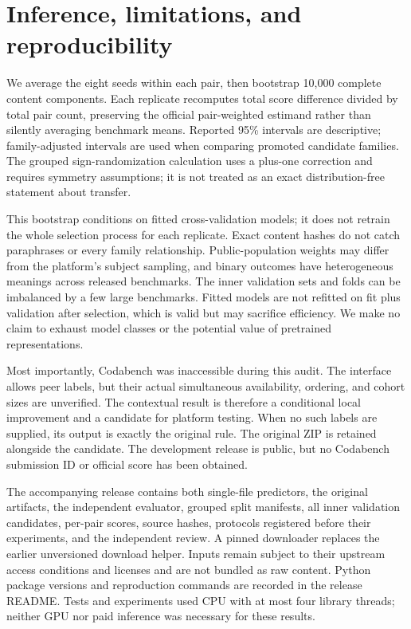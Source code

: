 \documentclass{article}
\begin{document}
\section{Inference, limitations, and reproducibility}
We average the eight seeds within each pair, then bootstrap 10,000 complete
content components. Each replicate recomputes total score difference divided
by total pair count, preserving the official pair-weighted estimand rather
than silently averaging benchmark means. Reported 95\% intervals are
descriptive; family-adjusted intervals are used when comparing promoted
candidate families. The grouped sign-randomization calculation uses a
plus-one correction and requires symmetry assumptions; it is not treated
as an exact distribution-free statement about transfer.

This bootstrap conditions on fitted cross-validation models; it does not
retrain the whole selection process for each replicate. Exact content hashes
do not catch paraphrases or every family relationship. Public-population
weights may differ from the platform's subject sampling, and binary outcomes
have heterogeneous meanings across released benchmarks. The inner validation
sets and folds can be imbalanced by a few large benchmarks. Fitted models
are not refitted on fit plus validation after selection, which is valid but
may sacrifice efficiency. We make no claim to exhaust model classes or
the potential value of pretrained representations.

Most importantly, Codabench was inaccessible during this audit. The interface
allows peer labels, but their actual simultaneous availability, ordering,
and cohort sizes are unverified. The contextual result is therefore a
conditional local improvement and a candidate for platform testing. When no
such labels are supplied, its output is exactly the original rule. The
original ZIP is retained alongside the candidate. The development release is
public, but no Codabench submission ID or official score has been obtained.

The accompanying release contains both single-file predictors, the original
artifacts, the independent evaluator, grouped split manifests, all inner
validation candidates, per-pair scores, source hashes, protocols registered
before their experiments, and the independent review. A pinned downloader
replaces the earlier unversioned download helper. Inputs remain subject to
their upstream access conditions and licenses and are not bundled as raw
content. Python package versions and reproduction commands are recorded in
the release README. Tests and experiments used CPU with at most four library
threads; neither GPU nor paid inference was necessary for these results.
\end{document}
